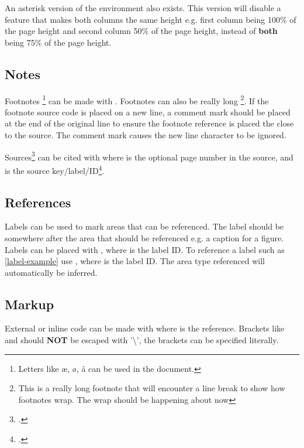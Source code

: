 An asterisk version of the environment also exists.
This version will disable a feature that makes both columns the same height
e.g. first column being 100\% of the page height and second column 50\% of the page height,
instead of \textbf{both} being 75\% of the page height.

\begin{multicols}{2}
    \lipsum[2]
\end{multicols}


\subsection{Notes}
Footnotes%
\footnote{Letters like æ, ø, å can be used in the document. }
can be made with .
Footnotes can also be really long%
\footnote{This is a really long footnote that will encounter a line break to show how footnotes wrap. The wrap should be happening about now}.
If the footnote source code is placed on a new line,
a comment mark \rawref{\%} should be placed at the end of the original line
to ensure the footnote reference is placed the close to the source.
The comment mark causes the new line character to be ignored.

\label{label-example} %

Sources\footcite[23]{DUMMY:1} can be cited with
where  is the optional page number in the source,
and  is the source key/label/ID\footcite[11]{DUMMY:2}.


\subsection{References}
Labels can be used to mark areas that can be referenced.
The label should be somewhere after the area that should be referenced e.g. a caption for a figure.
Labels can be placed with ,
where  is the label ID.
To reference a label such as \cref{label-example} use ,
where  is the label ID.
The area type referenced will automatically be inferred.


\subsection{Markup}
External or inline code  can be made with 
 where  is the reference. 
Brackets like \rawref{[} and \rawref{]} should \textbf{NOT} be escaped with '\textbackslash',
the brackets can be specified literally.


